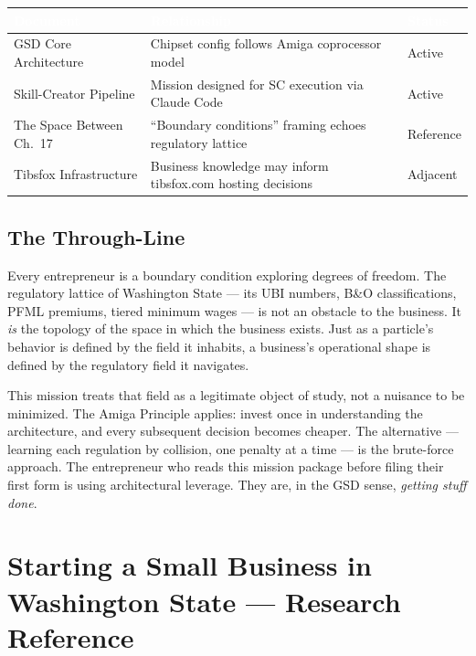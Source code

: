 \documentclass[11pt,letterpaper]{article}
\newcommand{\stageheader}[2]{%
  \noindent\colorbox{#2}{\makebox[\textwidth][l]{%
    \textcolor{white}{\bfseries\sffamily\hspace{6pt}#1\hspace{6pt}}}}%
  \vspace{0.5em}\par%
}
\newcommand{\tableheader}[1]{\textbf{\sffamily\textcolor{white}{#1}}}
\begin{document}
\begin{center}
\begin{tabularx}{\textwidth}{L{4cm}XC{2.5cm}}
\toprule
{}
\tableheader{Document} & \tableheader{Relationship} & \tableheader{Status} \\
\midrule
GSD Core Architecture & Chipset config follows Amiga coprocessor model & Active \\
Skill-Creator Pipeline & Mission designed for SC execution via Claude Code & Active \\
The Space Between Ch.\ 17 & ``Boundary conditions'' framing echoes regulatory lattice & Reference \\
Tibsfox Infrastructure & Business knowledge may inform tibsfox.com hosting decisions & Adjacent \\
\bottomrule
\end{tabularx}
\end{center}

\subsection{The Through-Line}

Every entrepreneur is a boundary condition exploring degrees of freedom. The regulatory lattice of Washington State --- its UBI numbers, B\&O classifications, PFML premiums, tiered minimum wages --- is not an obstacle to the business. It \emph{is} the topology of the space in which the business exists. Just as a particle's behavior is defined by the field it inhabits, a business's operational shape is defined by the regulatory field it navigates.

This mission treats that field as a legitimate object of study, not a nuisance to be minimized. The Amiga Principle applies: invest once in understanding the architecture, and every subsequent decision becomes cheaper. The alternative --- learning each regulation by collision, one penalty at a time --- is the brute-force approach. The entrepreneur who reads this mission package before filing their first form is using architectural leverage. They are, in the GSD sense, \emph{getting stuff done}.

\newpage

\stageheader{STAGE 2 --- RESEARCH REFERENCE}{secondary}

\section{Starting a Small Business in Washington State --- Research Reference}
\end{document}
